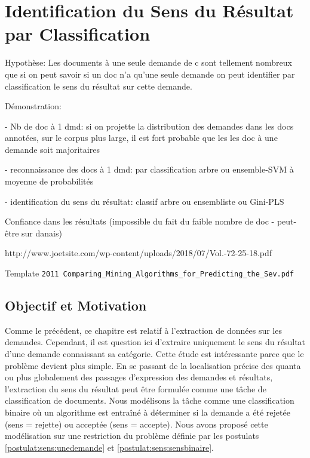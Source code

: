\chapter{Identification du Sens du Résultat par Classification}
\label{chap:sensresultat}

Hypothèse: Les documents à une seule demande de c sont tellement nombreux que si on peut savoir si un doc n'a qu'une seule demande on peut identifier par classification le sens du résultat sur cette demande.

Démonstration: 

- Nb de doc à 1 dmd: si on projette la distribution des demandes dans les docs annotées, sur le corpus plus large, il est fort probable que les les doc à une demande soit majoritaires

- reconnaissance des docs à 1 dmd:  par classification arbre ou ensemble-SVM à moyenne de probabilités

- identification du sens du résultat: classif arbre ou ensembliste ou Gini-PLS

Confiance dans les résultats (impossible du fait du faible nombre de doc - peut-être sur danais)

http://www.joetsite.com/wp-content/uploads/2018/07/Vol.-72-25-18.pdf

Template \verb=2011 Comparing_Mining_Algorithms_for_Predicting_the_Sev.pdf=

\section{Objectif et Motivation}
\label{sec:sensresultat:motivation}
Comme le précédent, ce chapitre est relatif à l'extraction de données sur les demandes. Cependant, il est question ici d'extraire uniquement le sens du résultat d'une demande connaissant sa catégorie. Cette étude est intéressante parce que le problème devient plus simple. En se passant de la localisation précise des quanta ou plus globalement des passages d'expression des demandes et résultats, l'extraction du sens du résultat peut être formulée comme une tâche de classification de documents. Nous modélisons la tâche comme une classification binaire où un algorithme est entraîné à déterminer si la demande a été rejetée (sens = rejette) ou acceptée (sens = accepte). Nous avons proposé cette modélisation sur une restriction du problème définie par les postulats \ref{postulat:sens:unedemande} et \ref{postulat:sens:sensbinaire}.

